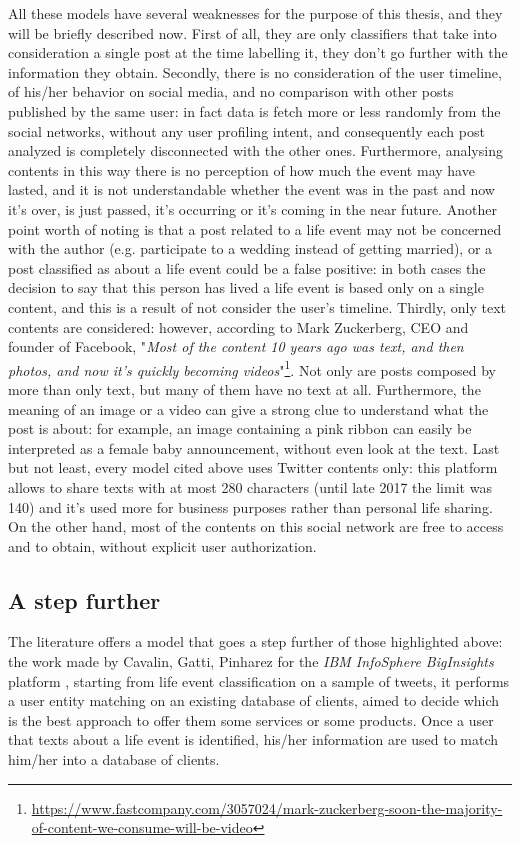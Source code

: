 All these models have several weaknesses for the purpose of this thesis, and they will be briefly described now. First of all, they are only classifiers that take into consideration a single post at the time labelling it, they don't go further with the information they obtain. Secondly, there is no consideration of the user timeline, of his/her behavior on social media, and no comparison with other posts published by the same user: in fact data is fetch more or less randomly from the social networks, without any user profiling intent, and consequently each post analyzed is completely disconnected with the other ones. Furthermore, analysing contents in this way there is no perception of how much the event may have lasted, and it is not understandable whether the event was in the past and now it's over, is just passed, it's occurring or it's coming in the near future. Another point worth of noting is that a post related to a life event may not be concerned with the author (e.g. participate to a wedding instead of getting married), or a post classified as about a life event could be a false positive: in both cases the decision to say that this person has lived a life event is based only on a single content, and this is a result of not consider the user's timeline. Thirdly, only text contents are considered: however, according to Mark Zuckerberg, CEO and founder of Facebook, "\textit{Most of the content 10 years ago was text, and then photos, and now it's quickly becoming videos}"\footnote{\url{https://www.fastcompany.com/3057024/mark-zuckerberg-soon-the-majority-of-content-we-consume-will-be-video}}. Not only are posts composed by more than only text, but many of them have no text at all. Furthermore, the meaning of an image or a video can give a strong clue to understand what the post is about: for example, an image containing a pink ribbon can easily be interpreted as a female baby announcement, without even look at the text. Last but not least, every model cited above uses Twitter contents only: this platform allows to share texts with at most 280 characters (until late 2017 the limit was 140) and it's used more for business purposes rather than personal life sharing. On the other hand, most of the contents on this social network are free to access and to obtain, without explicit user authorization.

\subsection{A step further}
The literature offers a model that goes a step further of those highlighted above: the work made by Cavalin, Gatti, Pinharez for the \textit{IBM InfoSphere BigInsights} platform \cite{cavalin2014towards}, starting from life event classification on a sample of tweets, it performs a user entity matching on an existing database of clients, aimed to decide which is the best approach to offer them some services or some products. Once a user that texts about a life event is identified, his/her information are used to match him/her into a database of clients.

